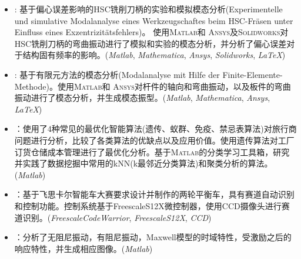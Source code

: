 \documentclass[zh]{resume}
\newcommand{\Matlab}{\textsc{Matlab}\textregistered }
\newcommand{\Ansys}{\textsc{Ansys}\textregistered }
\newcommand{\Solidworks}{\textsc{Solidworks}\textregistered }
\begin{document}
\begin{itemize}
	\setlength{\itemsep}{4pt}
	\item 
	: 
	基于偏心误差影响的HSC铣削刀柄的实验和模拟模态分析(Experimentelle und simulative Modalanalyse eines Werkzeugschaftes beim HSC-Fräsen unter Einfluss eines Exzentrizitätsfehlers)。 使用\Matlab 和 \Ansys 及\Solidworks 对HSC铣削刀柄的弯曲振动进行了模拟和实验的模态分析，并分析了偏心误差对于结构固有频率的影响。(\textit{Matlab\textregistered}, \textit{Mathematica\textregistered}, \textit{Ansys\textregistered}, \textit{Solidworks\textregistered}, \textit{\LaTeX})
	
	\item 
	: 
	基于有限元方法的模态分析(Modalanalyse mit Hilfe der Finite-Elemente-Methode)。使用\Matlab 和 \Ansys 对杆件的轴向和弯曲振动，以及板件的弯曲振动进行了模态分析，并生成模态振型。(\textit{Matlab\textregistered}, \textit{Mathematica\textregistered}, \textit{Ansys\textregistered}, \textit{\LaTeX})
	
	\item 
	：使用了4种常见的最优化智能算法(遗传、蚁群、免疫、禁忌表算法)对旅行商问题进行分析，比较了各类算法的优缺点以及应用价值。使用遗传算法对工厂订货仓储成本管理进行了最优化分析。基于\Matlab 的分类学习工具箱，研究并实践了数据挖掘中常用的kNN(k最邻近分类算法)和聚类分析的算法。(\textit{Matlab\textregistered})
	
	\item {}：基于飞思卡尔智能车大赛要求设计并制作的两轮平衡车，具有赛道自动识别和控制功能。控制系统基于Freescale\textregistered S12X微控制器，使用CCD摄像头进行赛道识别。(\textit{Freescale\textregistered CodeWarrior}, \textit{Freescale\textregistered S12X}, \textit{CCD})
	
	\item {}：分析了无阻尼振动，有阻尼振动，Maxwell模型的时域特性，受激励之后的响应特性，并生成相应图像。(\textit{Matlab\textregistered})
	
	
  		
\end{itemize}
\end{document}
